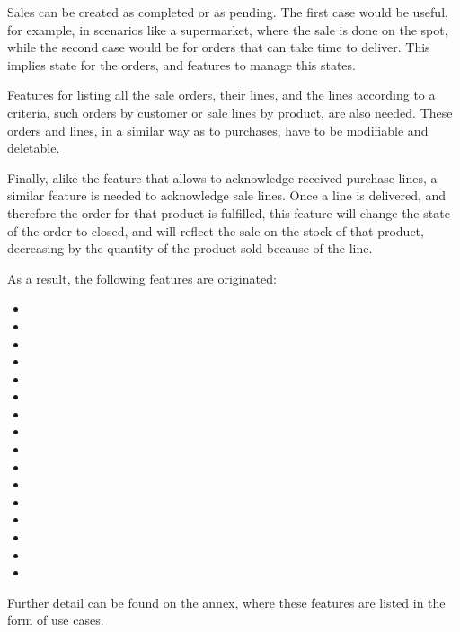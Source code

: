 Sales can be created as completed or as pending. The first case would be useful, for example, in scenarios like a supermarket, where the sale is done on the spot, while the second case would be for orders that can take time to deliver. This implies state for the orders, and features to manage this states.

Features for listing all the sale orders, their lines, and the lines according to a criteria, such orders by customer or sale lines by product, are also needed. These orders and lines, in a similar way as to purchases, have to be modifiable and deletable.

Finally, alike the feature that allows to acknowledge received purchase lines, a similar feature is needed to acknowledge sale lines. Once a line is delivered, and therefore the order for that product is fulfilled, this feature will change the state of the order to closed, and will reflect the sale on the stock of that product, decreasing by the quantity of the product sold because of the line.

As a result, the following features are originated:
\hfill\break
\begin{itemize}
\item {}
\item {}
\item {}
\item {}
\item {}
\item {}
\item {}
\item {}
\item {}
\item {}
\item {}
\item {}
\item {}
\item {}
\item {}
\item {}
\end{itemize}
\hfill\break
Further detail can be found on the annex, where these features are listed in the form of use cases.